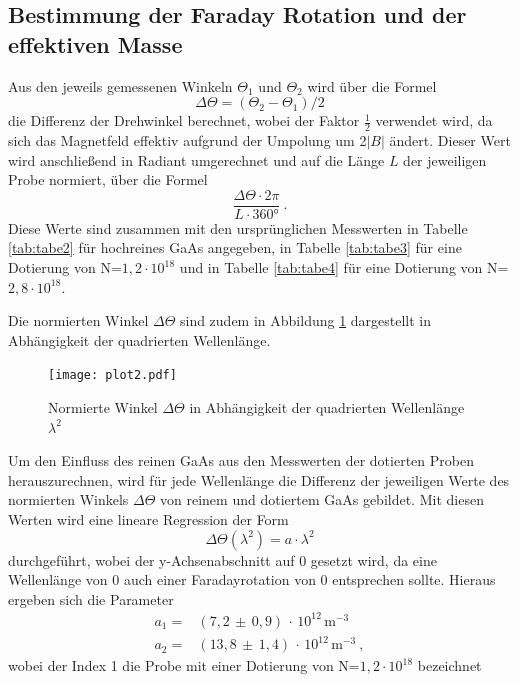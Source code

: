 \subsection{Bestimmung der Faraday Rotation und der effektiven Masse}
Aus den jeweils gemessenen Winkeln $\Theta_1$ und $\Theta_2$ wird über die Formel
\begin{equation}
  \Delta \Theta =(\Theta_2-\Theta_1)/2
\end{equation}
die Differenz der Drehwinkel berechnet, wobei der Faktor $\frac{1}{2}$ verwendet wird, da
sich das Magnetfeld effektiv aufgrund der Umpolung um 2$\lvert B \rvert$ ändert.
Dieser Wert wird anschließend in Radiant umgerechnet und auf die Länge $L$ der
jeweiligen Probe normiert,
über die Formel
\begin{equation}
  \frac{\Delta \Theta \cdot 2\pi}{L\cdot360°} \: .
\end{equation}
Diese Werte sind zusammen mit den ursprünglichen Messwerten in Tabelle \ref{tab:tabe2} für hochreines
GaAs angegeben, in Tabelle \ref{tab:tabe3} für eine Dotierung von N=$1,2\cdot10^{18}$ und
in Tabelle \ref{tab:tabe4} für eine Dotierung von N=$2,8\cdot10^{18}$.



Die normierten Winkel $\Delta \Theta$ sind zudem in Abbildung \ref{fig:plot2}
dargestellt in Abhängigkeit der quadrierten Wellenlänge. \\
\begin{figure}
  \centering
  \texttt{[image: plot2.pdf]}
  \caption{Normierte Winkel $\Delta \Theta$ in Abhängigkeit der quadrierten Wellenlänge $\lambda^2$}
  \label{fig:plot2}
\end{figure}
Um den Einfluss des reinen GaAs aus den Messwerten der dotierten Proben herauszurechnen, wird
für jede Wellenlänge die Differenz der jeweiligen
Werte des normierten Winkels $\Delta \Theta$ von reinem und dotiertem GaAs gebildet.
Mit diesen Werten wird eine lineare Regression der Form
\begin{equation}
  \Delta \Theta(\lambda^2)=a\cdot\lambda^2
\end{equation}
durchgeführt, wobei der y-Achsenabschnitt auf 0 gesetzt wird, da eine Wellenlänge von 0
auch einer Faradayrotation von 0 entsprechen sollte.
Hieraus ergeben sich die Parameter
\begin{align}
  a_1=& (7,2\,\pm\,0,9)\,\cdot\,10^{12}\,\text{m}^{-3} \\
  a_2=& (13,8\,\pm\,1,4)\,\cdot\,10^{12}\,\text{m}^{-3} \: ,
\end{align}
wobei der Index 1 die Probe mit einer Dotierung von N=$1,2\cdot10^{18}$ bezeichnet
